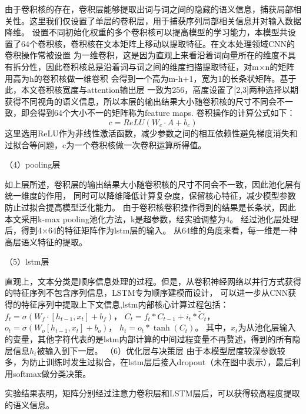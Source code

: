   由于卷积核的存在，卷积层能够提取出词与词之间的隐藏的语义信息，捕获局部相关性。这里我们仅设置了单层的卷积层，用于捕获序列局部相关信息并对输入数据降维。
  设置不同初始化权重的多个卷积核可以提高模型的学习能力，本模型共设置了64个卷积核，卷积核在文本矩阵上移动以提取特征。在文本处理领域CNN的卷积操作常被设置
  为一维卷积，这是因为直观上来看沿着词向量所在的维度不具有拆分性，因此卷积核总是沿着词与词之间的维度扫描提取特征，对m×n的矩阵用高为h的卷积核做一维卷积
  会得到一个高为m-h+1，宽为1的长条状矩阵。基于此，本文卷积核宽度与attention输出层
  一致为256，高度设置了[2,3]两种选择以期获得不同视角的语义信息，所以本层的输出结果大小随卷积核的尺寸不同会不一致，即会得到64个大小不一的矩阵称为feature maps.
  卷积操作的计算公式如下：
  \begin{equation}
    c=ReLU(W_{c} \cdot A+b_{c})
    \end{equation}
    这里选用ReLU作为非线性激活函数，减少参数之间的相互依赖性避免梯度消失和过拟合等问题，c为一个卷积核做一次卷积运算所得值。

   （4）pooling层

    如上层所述，卷积层的输出结果大小随卷积核的尺寸不同会不一致，因此池化层有统一维度的作用，
    同时可以降维降低计算复杂度，保留核心特征，减少模型参数防止过拟合提高模型泛化能力。
    由于卷积核卷积操作得到的结果是长条状，因此本文采用k-max pooling池化方法，k是超参数，经实验调整为4。
    经过池化层处理后，得到4×64的特征矩阵作为lstm层的输入。
    从64维的角度来看，每一维是一种高层语义特征的提取。

    （5）lstm层

  直观上，文本分类是顺序信息处理的过程。但是，从卷积神经网络以并行方式获得的特征序列不包含序列信息，LSTM专为顺序建模而设计，
  可以进一步从CNN获得的特征序列中提取上下文信息,lstm内部核心计算过程包括：$f_{t}=σ(W_{f}\cdot[h_{t-1},x_t]+b_{f})$，
  $C_{t}=f_{t} * C_{t-1}+i_{t} * \tilde{C}_{t}$，$o_{t}=\sigma\left(W_{o}\left[h_{t-1}, x_{t}\right]+b_{o}\right)$，
  $h_{t}=o_{t} * \tanh \left(C_{t}\right)$。
    其中，$x_t$为从池化层输入的变量，其他字符代表的是lstm内部计算的中间过程变量不再赘述，得到的所有隐层信息$h_t$被输入到下一层。
  （6）优化层与决策层
    由于本模型层度较深参数较多，为防止训练时发生过拟合，在lstm层后接入dropout（未在图中表示），最后利用softmax做分类决策。

实验结果表明，矩阵分别经过注意力卷积层和LSTM层后，可以获得较高程度提取的语义信息。



